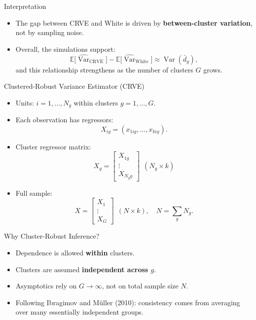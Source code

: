 \documentclass[
  ignorenonframetext,
]{beamer}
\providecommand{\tightlist}{%
  \setlength{\itemsep}{0pt}\setlength{\parskip}{0pt}}
\begin{document}
\begin{frame}{Interpretation}
\label{interpretation}
\begin{itemize}
\tightlist
\item
  The gap between CRVE and White is driven by \textbf{between-cluster
  variation},\\
  not by sampling noise.
\item
  Overall, the simulations support: \[
  \mathbb{E}\big[\widehat{\operatorname{Var}}_{\text{CRVE}}\big]
  -
  \mathbb{E}\big[\widehat{\operatorname{Var}}_{\text{White}}\big]
  \approx
  \operatorname{Var}(\bar d_g),
  \] and this relationship strengthens as the number of clusters \(G\)
  grows.
\end{itemize}
\end{frame}

\begin{frame}{Clustered-Robust Variance Estimator (CRVE)}
\label{clustered-robust-variance-estimator-crve}
\begin{itemize}
\tightlist
\item
  Units: \(i=1,\dots,N_g\) within clusters \(g=1,\dots,G\).\\
\item
  Each observation has regressors: \[
  X_{ig} = (x_{1ig},\dots,x_{kig}).
  \]
\item
  Cluster regressor matrix: \[
  X_g =
  \begin{bmatrix}
  X_{1g}\\\vdots\\X_{N_g g}
  \end{bmatrix}
  \ \ (N_g\times k)
  \]
\item
  Full sample: \[
  X =
  \begin{bmatrix}
  X_1\\\vdots\\X_G
  \end{bmatrix}
  \ \ (N\times k),\quad N=\sum_g N_g.
  \]
\end{itemize}
\end{frame}

\begin{frame}{Why Cluster-Robust Inference?}
\label{why-cluster-robust-inference}
\begin{itemize}
\tightlist
\item
  Dependence is allowed \textbf{within} clusters.\\
\item
  Clusters are assumed \textbf{independent across \(g\)}.\\
\item
  Asymptotics rely on \textbf{\(G\to\infty\)}, not on total sample size
  \(N\).
\item
  Following Ibragimov and Müller (2010): consistency comes from
  averaging over many essentially independent groups.
\end{itemize}
\end{frame}
\end{document}
